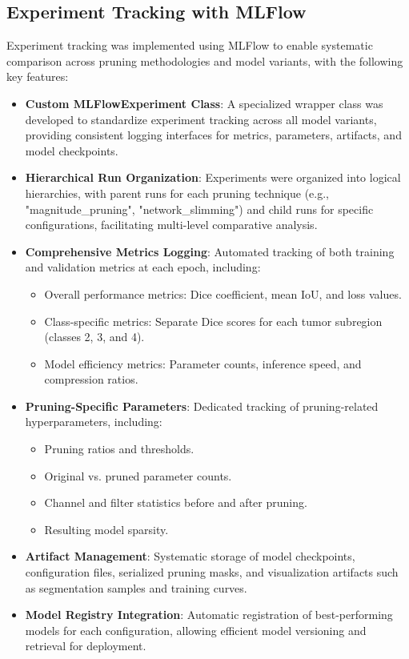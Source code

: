 \documentclass[12pt,a4paper]{article}
\begin{document}
\subsection{Experiment Tracking with MLFlow}
Experiment tracking was implemented using MLFlow to enable systematic comparison across pruning methodologies and model variants, with the following key features:

\begin{itemize}
    \item \textbf{Custom MLFlowExperiment Class}: A specialized wrapper class was developed to standardize experiment tracking across all model variants, providing consistent logging interfaces for metrics, parameters, artifacts, and model checkpoints.
    
    \item \textbf{Hierarchical Run Organization}: Experiments were organized into logical hierarchies, with parent runs for each pruning technique (e.g., "magnitude\_pruning", "network\_slimming") and child runs for specific configurations, facilitating multi-level comparative analysis.
    
    \item \textbf{Comprehensive Metrics Logging}: Automated tracking of both training and validation metrics at each epoch, including:
    \begin{itemize}
        \item Overall performance metrics: Dice coefficient, mean IoU, and loss values.
        \item Class-specific metrics: Separate Dice scores for each tumor subregion (classes 2, 3, and 4).
        \item Model efficiency metrics: Parameter counts, inference speed, and compression ratios.
    \end{itemize}
    
    \item \textbf{Pruning-Specific Parameters}: Dedicated tracking of pruning-related hyperparameters, including:
    \begin{itemize}
        \item Pruning ratios and thresholds.
        \item Original vs. pruned parameter counts.
        \item Channel and filter statistics before and after pruning.
        \item Resulting model sparsity.
    \end{itemize}
    
    \item \textbf{Artifact Management}: Systematic storage of model checkpoints, configuration files, serialized pruning masks, and visualization artifacts such as segmentation samples and training curves.
    
    \item \textbf{Model Registry Integration}: Automatic registration of best-performing models for each configuration, allowing efficient model versioning and retrieval for deployment.
\end{itemize}
\end{document}
